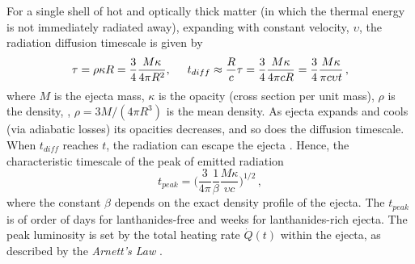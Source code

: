 For a single shell of hot and optically thick matter 
(in which the thermal energy is not immediately radiated away), 
expanding with constant velocity, $\upsilon$, 
the radiation diffusion timescale is given by 
%
\begin{equation}
\tau = \rho \kappa R = \frac{3}{4}\frac{M\kappa}{4\pi R^2}, \hspace{5mm} 
t_{diff} \approx \frac{R}{c}\tau = \frac{3}{4}\frac{M\kappa}{4\pi c R} = \frac{3}{4}\frac{M\kappa}{\pi c \upsilon t}\, ,
\end{equation}
%
where $M$ is the ejecta mass, $\kappa$ is the opacity (cross section per unit mass), 
$\rho$ is the density, \eg, $\rho=3M/(4\pi R^3)$ is the mean density.
%
As ejecta expands and cools (via adiabatic losses) its opacities decreases, 
and so does the diffusion timescale. 
When $t_{diff}$ reaches $t$, the radiation can escape the ejecta \citep{Arnett:1982}. 
Hence, the characteristic timescale of the peak of emitted radiation 
%
\begin{equation}
t_{peak} = \Big(\frac{3}{4\pi}\frac{1}{\beta}\frac{M\kappa}{\upsilon c}\Big)^{1/2}\, ,
\end{equation}
%
where the constant $\beta$ depends on the exact density profile of the ejecta. 
The $t_{peak}$ is of order of days for lanthanides-free and weeks for lanthanides-rich ejecta.
The peak luminosity is set by the total heating rate $\dot{Q}(t)$ within the ejecta, 
as described by the \textit{Arnett's Law} \citep{Arnett:1982}. 



